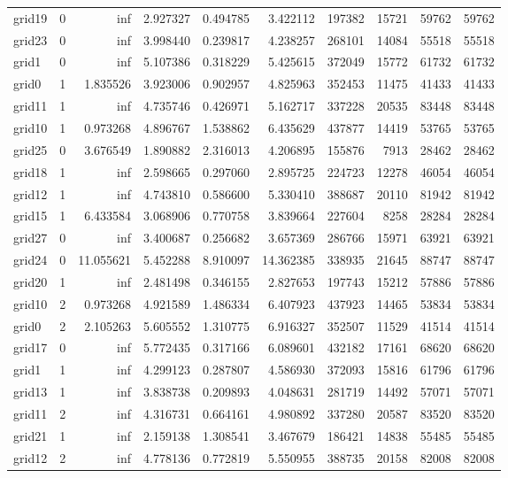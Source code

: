 \begin{longtable}{|l|r|r|r|r|r|r|r|r|r|}
grid19 & 0 & inf & 2.927327 & 0.494785 & 3.422112 & 197382 & 15721 & 59762 & 59762 \\
grid23 & 0 & inf & 3.998440 & 0.239817 & 4.238257 & 268101 & 14084 & 55518 & 55518 \\
grid1 & 0 & inf & 5.107386 & 0.318229 & 5.425615 & 372049 & 15772 & 61732 & 61732 \\
grid0 & 1 & 1.835526 & 3.923006 & 0.902957 & 4.825963 & 352453 & 11475 & 41433 & 41433 \\
grid11 & 1 & inf & 4.735746 & 0.426971 & 5.162717 & 337228 & 20535 & 83448 & 83448 \\
grid10 & 1 & 0.973268 & 4.896767 & 1.538862 & 6.435629 & 437877 & 14419 & 53765 & 53765 \\
grid25 & 0 & 3.676549 & 1.890882 & 2.316013 & 4.206895 & 155876 & 7913 & 28462 & 28462 \\
grid18 & 1 & inf & 2.598665 & 0.297060 & 2.895725 & 224723 & 12278 & 46054 & 46054 \\
grid12 & 1 & inf & 4.743810 & 0.586600 & 5.330410 & 388687 & 20110 & 81942 & 81942 \\
grid15 & 1 & 6.433584 & 3.068906 & 0.770758 & 3.839664 & 227604 & 8258 & 28284 & 28284 \\
grid27 & 0 & inf & 3.400687 & 0.256682 & 3.657369 & 286766 & 15971 & 63921 & 63921 \\
grid24 & 0 & 11.055621 & 5.452288 & 8.910097 & 14.362385 & 338935 & 21645 & 88747 & 88747 \\
grid20 & 1 & inf & 2.481498 & 0.346155 & 2.827653 & 197743 & 15212 & 57886 & 57886 \\
grid10 & 2 & 0.973268 & 4.921589 & 1.486334 & 6.407923 & 437923 & 14465 & 53834 & 53834 \\
grid0 & 2 & 2.105263 & 5.605552 & 1.310775 & 6.916327 & 352507 & 11529 & 41514 & 41514 \\
grid17 & 0 & inf & 5.772435 & 0.317166 & 6.089601 & 432182 & 17161 & 68620 & 68620 \\
grid1 & 1 & inf & 4.299123 & 0.287807 & 4.586930 & 372093 & 15816 & 61796 & 61796 \\
grid13 & 1 & inf & 3.838738 & 0.209893 & 4.048631 & 281719 & 14492 & 57071 & 57071 \\
grid11 & 2 & inf & 4.316731 & 0.664161 & 4.980892 & 337280 & 20587 & 83520 & 83520 \\
grid21 & 1 & inf & 2.159138 & 1.308541 & 3.467679 & 186421 & 14838 & 55485 & 55485 \\
grid12 & 2 & inf & 4.778136 & 0.772819 & 5.550955 & 388735 & 20158 & 82008 & 82008 \\

\end{longtable}

